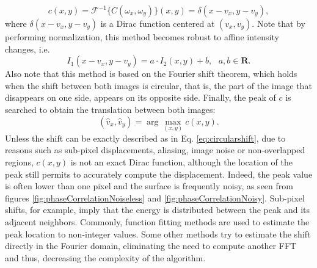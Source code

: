 \begin{equation}
c(x,y) = \mathcal{F}^{-1}\bigg\{ C(\omega_x,\omega_y) \bigg\}(x,y) = \delta(x-v_x, y-v_y),
\label{eq:phasecorrelationMatrix}
\end{equation}
where $\delta(x-v_x, y-v_y)$ is a Dirac function centered at $(v_x,v_y)$. 
Note that by performing normalization, this method becomes robust to affine intensity changes, i.e.
\begin{equation}
\label{eq:affineShift}
I_1(x - v_x, y - v_y) = a \cdot I_2(x,y) + b, \ \ \ a,b \in \mathbf{R}.
\end{equation}
Also note that this method is based on the Fourier shift theorem, which holds when the shift between both images is circular, that is, the part of the image that disappears on one side, appears on its opposite side.
Finally, the peak of $c$ is searched to obtain the translation between both images:
\begin{equation}
\label{eq:maxPC}
(\hat{v}_x,\hat{v}_y) = \arg \max_{(x,y)}{c(x,y)}.
\end{equation}
Unless the shift can be exactly described as in Eq. \eqref{eq:circularshift}, due to reasons such as sub-pixel displacements, aliasing, image noise or non-overlapped regions, $c(x,y)$  is not an exact Dirac function, although the location of the peak still permits to accurately compute the displacement. Indeed, the peak value is often lower than one pixel and the surface is frequently noisy, as seen from figures \ref{fig:phaseCorrelationNoiseless} and \ref{fig:phaseCorrelationNoisy}. Sub-pixel shifts, for example, imply that the energy is distributed between the peak and its adjacent neighbors. Commonly, function fitting methods are used to estimate the peak location to non-integer values. Some other methods try to estimate the shift directly in the Fourier domain, eliminating the need to compute another FFT and thus, decreasing the complexity of the algorithm. 

